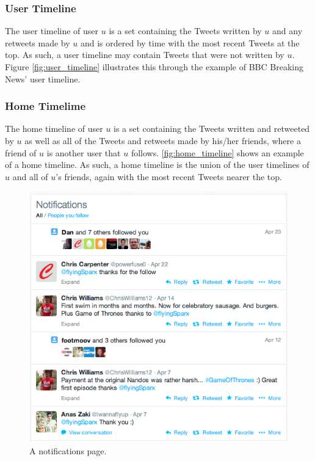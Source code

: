 \subsubsection{User Timeline}
The user timeline of user $u$ is a set containing the Tweets written by $u$ and any retweets made by $u$ and is ordered by time with the most recent Tweets at the top. As such, a user timeline may contain Tweets that were not written by $u$. Figure \ref{fig:user_timeline} illustrates this through the example of BBC Breaking News' user timeline.

\subsubsection{Home Timelime}
The home timeline of user $u$ is a set containing the Tweets written and retweeted by $u$ as well as all of the Tweets and retweets made by his/her friends, where a friend of $u$ is another user that $u$ follows. \ref{fig:home_timeline} shows an example of a home timeline. As such, a home timeline is the union of the user timelines of $u$ and all of $u$'s friends, again with the most recent Tweets nearer the top.

\begin{figure}[h]
\centering
\includegraphics[scale=0.6]{2.Background/Media/notifications_page.png} 
\caption{A notifications page.}
\label{fig:notifications_page}
\end{figure}

